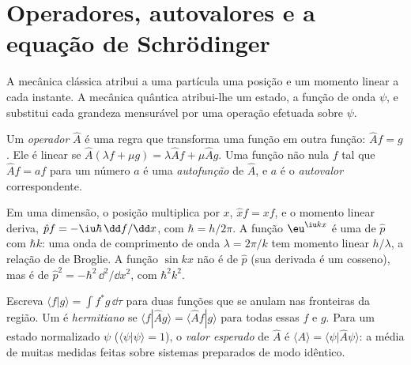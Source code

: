 \section{Operadores, autovalores e a equação de Schrödinger}

A mecânica clássica atribui a uma partícula uma posição e um momento linear
a cada instante. A mecânica quântica atribui-lhe um estado, a função de onda
$\psi$, e substitui cada grandeza mensurável por uma operação efetuada sobre $\psi$.

\begin{definition}\label{def:b3:quantum-model-systems:operator}
Um \emph{operador} $\hat A$ é uma regra que transforma uma
função em outra função: $\hat A f = g$. Ele é linear se $\hat A(\lambda f +
\mu g) = \lambda\hat Af + \mu\hat Ag$. Uma função não nula $f$ tal que
$\hat Af = a f$ para um número $a$ é uma \emph{autofunção}
de $\hat A$, e $a$ é o \emph{autovalor} correspondente.
\end{definition}

\begin{example}\label{ex:b3:quantum-model-systems:xp}
Em uma dimensão, o  posição multiplica por $x$, $\hat x f = xf$,
e o  momento linear deriva, $\hat p f = -\iu\hbar\,
\dd f/\dd x$, com $\hbar = h/2\pi$. A função $\eu^{\iu kx}$ é uma
 de $\hat p$ com  $\hbar k$: uma onda de comprimento de
onda $\lambda = 2\pi/k$ tem momento linear $h/\lambda$, a relação de de Broglie.
A função $\sin kx$ não é  de $\hat p$ (sua derivada é um
cosseno), mas é  de $\hat p^2 = -\hbar^2\,\dd^2/\dd x^2$, com
 $\hbar^2k^2$.
\end{example}

\begin{definition}\label{def:b3:quantum-model-systems:hermitian}
Escreva $\langle f|g\rangle = \int f^*g\,\dd\tau$ para duas funções que se
anulam nas fronteiras da região. Um  é \emph{hermitiano}
se $\langle f|\hat Ag\rangle = \langle \hat Af|g\rangle$ para todas essas
$f$ e $g$. Para um estado normalizado $\psi$ ($\langle\psi|\psi\rangle = 1$), o
\emph{valor esperado} de $\hat A$ é
$\langle A\rangle = \langle\psi|\hat A\psi\rangle$: a média de muitas
medidas feitas sobre sistemas preparados de modo idêntico.
\end{definition}

